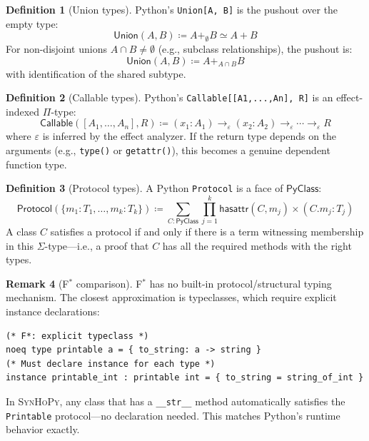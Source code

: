 \documentclass[11pt,a4paper]{report}
\theoremstyle{definition}
\newtheorem{definition}{Definition}[chapter]
\newtheorem{remark}[definition]{Remark}
\theoremstyle{plain}
\newcommand{\PyClass}{\mathsf{PyClass}}
\newcommand{\defeq}{\coloneqq}
\newcommand{\fstar}{F$^{*}$}
\newcommand{\synhopy}{\textsc{SynHoPy}}
\begin{document}
\begin{definition}[Union types]
Python's \lstinline[style=python]{Union[A, B]} is the pushout over the
empty type:
\[
  \mathsf{Union}(A, B) \defeq A +_\emptyset B \simeq A + B
\]
For non-disjoint unions $A \cap B \neq \emptyset$ (e.g., subclass relationships),
the pushout is:
\[
  \mathsf{Union}(A, B) \defeq A +_{A \cap B} B
\]
with identification of the shared subtype.
\end{definition}

\begin{definition}[Callable types]
Python's \lstinline[style=python]{Callable[[A1,...,An], R]} is an effect-indexed
$\Pi$-type:
\[
  \mathsf{Callable}([A_1, \ldots, A_n], R) \defeq
  (x_1 : A_1) \to_\varepsilon (x_2 : A_2) \to_\varepsilon \cdots \to_\varepsilon R
\]
where $\varepsilon$ is inferred by the effect analyzer.  If the return type
depends on the arguments (e.g., \lstinline[style=python]{type()} or
\lstinline[style=python]{getattr()}), this becomes a genuine dependent function type.
\end{definition}

\begin{definition}[Protocol types]
A Python \lstinline[style=python]{Protocol} is a face of $\PyClass$:
\[
  \mathsf{Protocol}(\{m_1 : T_1, \ldots, m_k : T_k\}) \defeq
  \sum_{C : \PyClass} \prod_{j=1}^{k} \mathsf{hasattr}(C, m_j) \times
    (C.m_j : T_j)
\]
A class $C$ satisfies a protocol if and only if there is a term witnessing
membership in this $\Sigma$-type---i.e., a proof that $C$ has all the required
methods with the right types.
\end{definition}

\begin{remark}[\fstar{} comparison]
\fstar{} has no built-in protocol/structural typing mechanism.  The closest
approximation is typeclasses, which require explicit instance declarations:
\begin{lstlisting}[style=fstar]
(* F*: explicit typeclass *)
noeq type printable a = { to_string: a -> string }
(* Must declare instance for each type *)
instance printable_int : printable int = { to_string = string_of_int }
\end{lstlisting}
In \synhopy{}, any class that has a \lstinline[style=python]{__str__} method
automatically satisfies the \lstinline[style=python]{Printable} protocol---no
declaration needed.  This matches Python's runtime behavior exactly.
\end{remark}


\end{document}
